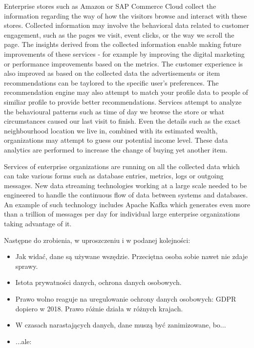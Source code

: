\documentclass[a4paper,twoside,12pt]{book}
\begin{document}
Enterprise stores such as Amazon or SAP Commerce Cloud collect the information regarding the way of how the visitors browse and interact with these stores. Collected information may involve the behavioral data related to customer engagement, such as the pages we visit, event clicks, or the way we scroll the page. The insights derived from the collected information enable making future improvements of these services - for example by improving the digital marketing or performance improvements based on the metrics.\cite{bib:sap} The customer experience is also improved as based on the collected data the advertisements or item recommendations can be taylored to the specific user's preferences. The recommendation engine may also attempt to match your profile data to people of similiar profile to provide better recommendations. Services attempt to analyze the behavioural patterns such as time of day we browse the store or what circumstances caused our last visit to finish. Even the details such as the exact neighbourhood location we live in, combined with its estimated wealth, organizations may attempt to guess our potential income level.\cite{bib:big_data_in_practice} These data analytics are performed to increase the change of buying yet another item.



Services of enterprise organizations are running on all the collected data which can take various forms such as database entries, metrics, logs or outgoing messages. New data streaming technologies working at a large scale needed to be engineered to handle the continuous flow of data between systems and databases. An example of such technology includes Apache Kafka which generates even more than a trillion of messages per day for individual large enterprise organizations taking advantage of it.\cite{bib:kafka_online}\cite{bib:kafka}


\vfill

\footnotesize
\color{blue}
Następne do zrobienia, w uproszczeniu i w podanej kolejności:
\begin{itemize}
\item Jak widać, dane są używane wszędzie. Przeciętna osoba sobie nawet nie zdaje sprawy.
\item Istota prywatności danych, ochrona danych osobowych.
\item Prawo wolno reaguje na uregulowanie ochrony danych osobowych: GDPR dopiero w 2018. Prawo różnie działa w różnych krajach.
\item W czasach narastających danych, dane muszą być zanimizowane, bo...
\item ...ale:
\end{itemize}
\end{document}
